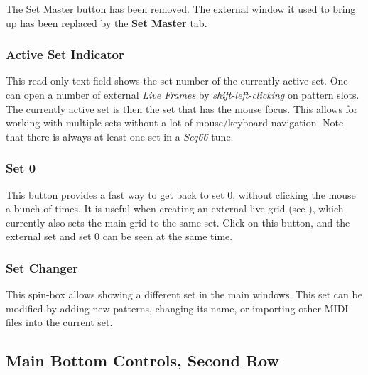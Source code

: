    The Set Master button has been removed.
   The external window it used to bring up has been replaced
   by the \textbf{Set Master} tab.


\subsubsection{Active Set Indicator}
\label{subsubsec:introduction_active_set_indicator}

   This read-only text field shows the set number of the currently active set.
   One can open a number of external \textsl{Live Frames} by
   \textsl{shift-left-clicking} on pattern slots.
   The currently active set is then the
   set that has the mouse focus.  This allows for working with multiple sets
   without a lot of mouse/keyboard navigation.
   Note that there is always at least one set in a \textsl{Seq66}
   tune.

\subsubsection{Set 0}
\label{subsubsec:introduction_set_zero}

   This button provides a fast way to get back to set 0, without clicking the
   mouse a bunch of times.
   It is useful when creating an external live grid
   (see ),
   which currently also sets the main grid to the same set.
   Click on this button, and the external set and set 0 can be seen at the same
   time.

\subsubsection{Set Changer}
\label{subsubsec:introduction_set_changer}

   This spin-box allows showing a different set in the main windows.
   This set can be modified by adding new patterns, changing its name, or
   importing other MIDI files into the current set.

\subsection{Main Bottom Controls, Second Row}
\label{subsec:introduction_main_bottom_controls_2}

